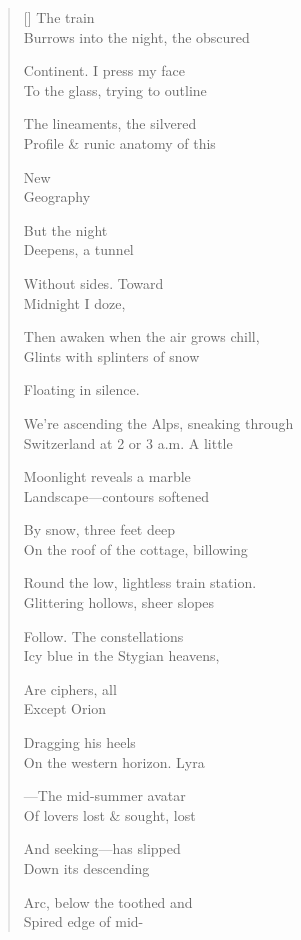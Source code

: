 \label{ch:night_passage}
\settowidth{\versewidth}{We're ascending the Alps, sneaking through}
\begin{verse}[\versewidth]
                              The train\\
Burrows into the night, the obscured

Continent.     I press my face\\
To the glass,     trying to outline

The lineaments, the silvered\\
Profile \& runic anatomy of this

New\\
Geography

But the night\\
Deepens, a tunnel

Without sides.     Toward\\
Midnight I doze,

Then awaken when the air grows chill,\\
Glints with splinters of snow

Floating in silence.

We're ascending the Alps, sneaking through\\
Switzerland at 2 or 3 a.m.     A little

Moonlight reveals a marble\\
Landscape---contours softened

By snow, three feet deep\\
On the roof of the cottage, billowing

Round the low, lightless train station.\\
Glittering hollows, sheer slopes

Follow. The constellations\\
Icy blue in the Stygian heavens,

Are ciphers, all\\
Except Orion

Dragging his heels\\
On the western horizon.     Lyra

---The mid-summer avatar\\
Of lovers lost \& sought, lost

And seeking---has slipped\\
Down its descending

Arc, below the toothed and\\
Spired edge of mid-


\end{verse}
